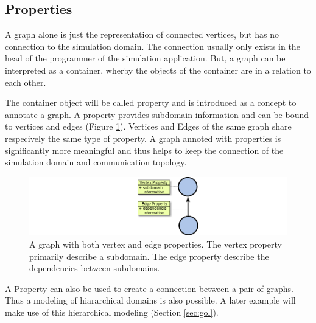 \subsection{Properties}
A graph alone is just the representation of connected vertices, but
has no connection to the simulation domain. The connection usually
only exists in the head of the programmer of the simulation
application. But, a graph can be interpreted as a container, wherby the
objects of the container are in a relation to each other.

The container object will be called property and is introduced as a
concept to annotate a graph. A property provides subdomain information
and can be bound to vertices and edges (Figure
\ref{fig:property}). Vertices and Edges of the same graph share
respecively the same type of property. A graph annoted with properties
is significantly more meaningful and thus helps to keep the connection
of the simulation domain and communication topology.

\begin{figure}[H]
  \centering \includegraphics[width=\textwidth]{graphics/30_property}
  \caption{A graph with both vertex and edge properties. The vertex
    property primarily describe a subdomain. The edge property
    describe the dependencies between subdomains.}
  \label{fig:property}
\end{figure}

A Property can also be used to create a connection between a pair of
graphs. Thus a modeling of hiararchical domains is also possible.  A
later example will make use of this hierarchical modeling (Section
\ref{sec:gol}).

